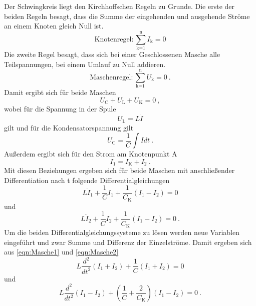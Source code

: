Der Schwingkreis liegt den Kirchhoffschen Regeln zu Grunde. Die erste der beiden Regeln besagt, dass die Summe der eingehenden und ausgehende Ströme an einem Knoten gleich Null ist.
\begin{equation}
  \text{Knotenregel} : \sum_{\text{k=1}}^\text{n} I_\text{k} = 0
  \label{eqn:K1}
\end{equation}
Die zweite Regel besagt, dass sich bei einer Geschlossenen Masche alle Teilspannungen, bei einem Umlauf zu Null addieren.
\begin{equation}
  \text{Maschenregel} : \sum_{\text{k=1}}^\text{n} U_\text{k} = 0 \ .
  \label{eqn:K2}
\end{equation}
Damit ergibt sich für beide Maschen
\begin{equation}
	U_\text{C} + U_\text{L} + U_\text{K} = 0 \ ,
\end{equation}
wobei für die Spannung in der Spule
\begin{equation*}
	U_\text{L} = L \dot{I}
\end{equation*}
gilt und für die Kondensatorspannung gilt
\begin{equation*}
	U_\text{C} = \frac{1}{C} \int \! \! \! \! I dt \ .
\end{equation*}
Außerdem ergibt sich für den Strom am Knotenpunkt A
\begin{equation*}
	I_1 = I_\text{K} + I_2 \ .
\end{equation*}
Mit diesen Beziehungen ergeben sich für beide Maschen mit anschließender Differentiation nach t folgende Differentialgleichungen
\begin{equation}
	L \ddot{I}_1 + \frac{1}{C} I_1 + \frac{1}{C_\text{K}}(I_1 - I_2) = 0
	\label{eqn:Masche1}
\end{equation}
und
\begin{equation}
	L \ddot{I}_2 + \frac{1}{C} I_2 + \frac{1}{C_\text{K}}(I_1 - I_2) = 0 \ .
	\label{eqn:Masche2}
\end{equation}
Um die beiden Differentialgleichungssysteme zu lösen werden neue Variablen eingeführt und zwar Summe und Differenz der Einzelströme. Damit ergeben sich aus 	\ref{eqn:Masche1} und \ref{eqn:Masche2}
\begin{equation}
	L \frac{d^2}{d t^2}(I_1 + I_2) + \frac{1}{C}(I_1 + I_2) = 0
	\label{eqn:DGL1}
\end{equation}
und
\begin{equation}
	L \frac{d^2}{d t^2}(I_1 - I_2) + \left(\frac{1}{C} + \frac{2}{C_\text{K}} \right)(I_1 - I_2) = 0 \ .
	\label{eqn:DGL2}
\end{equation}
